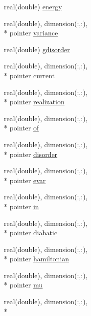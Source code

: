 \begin{DoxyCompactItemize}
\item 
real(double) \hyperlink{structdipoles__class_1_1dipoles_ac0229d4af6218531a78c4890b752a1e7}{energy}
\item 
real(double), dimension(\+:,\+:), \\*
pointer \hyperlink{structdipoles__class_1_1dipoles_afd272228e55cd38a7215e18d5e4008c0}{variance}
\item 
real(double) \hyperlink{structdipoles__class_1_1dipoles_a56a67d756e3344283660da0e91aefa93}{gdisorder}
\item 
real(double), dimension(\+:,\+:), \\*
pointer \hyperlink{structdipoles__class_1_1dipoles_a1f7d8ab8bd71a85a74e56b5461023742}{current}
\item 
real(double), dimension(\+:,\+:), \\*
pointer \hyperlink{structdipoles__class_1_1dipoles_a9f2ebcd22fb84b6121f41bb4b8935273}{realization}
\item 
real(double), dimension(\+:,\+:), \\*
pointer \hyperlink{structdipoles__class_1_1dipoles_ab0c3afd0f8e4b8c3a1ee521a7b96aefb}{of}
\item 
real(double), dimension(\+:,\+:), \\*
pointer \hyperlink{structdipoles__class_1_1dipoles_aa815bc50fc42d986bbb65c421adad3e1}{disorder}
\item 
real(double), dimension(\+:,\+:), \\*
pointer \hyperlink{structdipoles__class_1_1dipoles_a0ad9c6f181edabc7af6eb360edf07c63}{evar}
\item 
real(double), dimension(\+:,\+:), \\*
pointer \hyperlink{structdipoles__class_1_1dipoles_a72b5bb78d64f180123c27dd5cd9434fc}{in}
\item 
real(double), dimension(\+:,\+:), \\*
pointer \hyperlink{structdipoles__class_1_1dipoles_acb589f5c8c60337abc5da4b268ccd0e8}{diabatic}
\item 
real(double), dimension(\+:,\+:), \\*
pointer \hyperlink{structdipoles__class_1_1dipoles_adea6f688f172d2fc865a882326ab36e9}{hamiltonian}
\item 
real(double), dimension(\+:,\+:), \\*
pointer \hyperlink{structdipoles__class_1_1dipoles_a0112209fe626d20d6ef77facd97b5ad8}{mu}
\item 
real(double), dimension(\+:,\+:), \\*

\end{DoxyCompactItemize}
